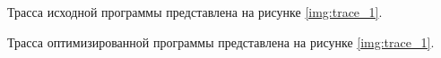 Трасса исходной программы представлена на рисунке \ref{img:trace_1}.
\begin{landscape}
	\begin{figure}
		\captionsetup{justification=centering}
	\end{figure}
\end{landscape}

Трасса оптимизированной программы представлена на рисунке \ref{img:trace_1}.
\begin{landscape}
	\begin{figure}
		\captionsetup{justification=centering}
	\end{figure}
\end{landscape}